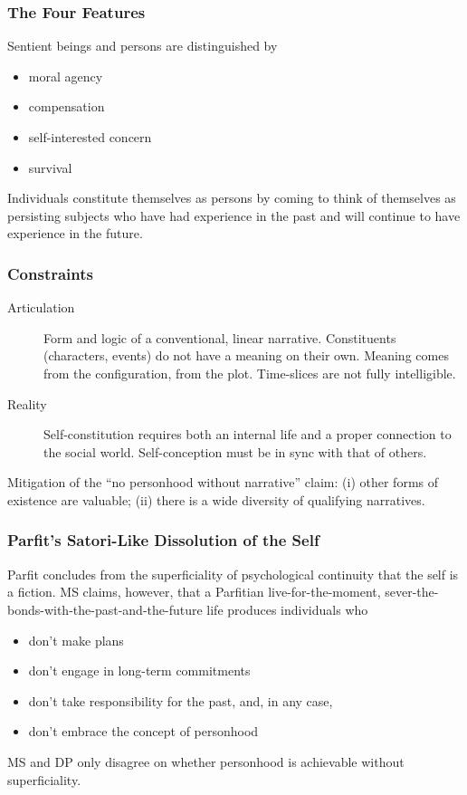 \documentclass[xcolor=dvipsnames]{beamer}
\begin{document}
\begin{frame}
  \frametitle{The Four Features}
  Sentient beings and persons are distinguished by
  \begin{itemize}
  \item moral agency
  \item compensation
  \item self-interested concern
  \item survival
  \end{itemize}
  Individuals constitute themselves as persons by coming to think of
  themselves as persisting subjects who have had experience in the
  past and will continue to have experience in the future.
\end{frame}

\begin{frame}
  \frametitle{Constraints}
  \begin{description}
  \item[Articulation] Form and logic of a conventional, linear
    narrative. Constituents (characters, events) do not have a meaning
    on their own. Meaning comes from the configuration, from the plot.
    Time-slices are not fully intelligible. 
  \item[Reality] Self-constitution requires both an internal life and
    a proper connection to the social world. Self-conception must be
    in sync with that of others.
  \end{description}
  Mitigation of the ``no personhood without narrative'' claim: (i)
  other forms of existence are valuable; (ii) there is a wide
  diversity of qualifying narratives.
\end{frame}

\begin{frame}
  \frametitle{Parfit's Satori-Like Dissolution of the Self}
  Parfit concludes from the superficiality of psychological continuity
  that the self is a fiction. MS claims, however, that a Parfitian
  live-for-the-moment, sever-the-bonds-with-the-past-and-the-future
  life produces individuals who
  \begin{itemize}
  \item don't make plans
  \item don't engage in long-term commitments
  \item don't take responsibility for the past, and, in any case,
  \item don't embrace the concept of personhood
  \end{itemize}
  MS and DP only disagree on whether personhood is achievable without superficiality.
\end{frame}
\end{document}
